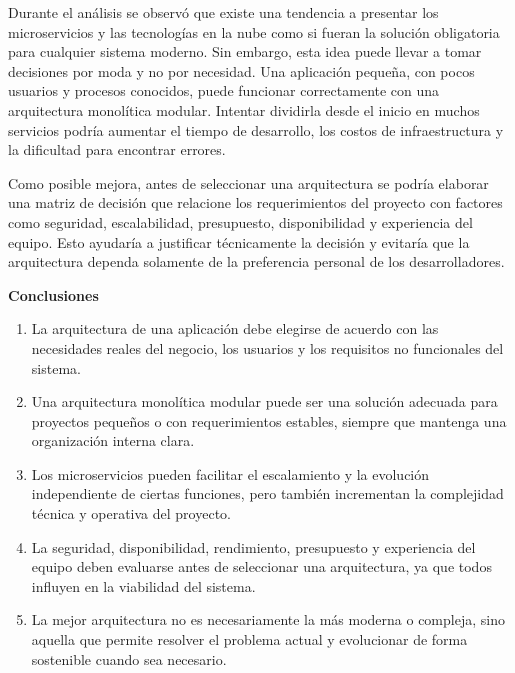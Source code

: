 \documentclass[12pt,letterpaper]{article}
\begin{document}
Durante el análisis se observó que existe una tendencia a presentar los microservicios y las tecnologías en la nube como si fueran la solución obligatoria para cualquier sistema moderno. Sin embargo, esta idea puede llevar a tomar decisiones por moda y no por necesidad. Una aplicación pequeña, con pocos usuarios y procesos conocidos, puede funcionar correctamente con una arquitectura monolítica modular. Intentar dividirla desde el inicio en muchos servicios podría aumentar el tiempo de desarrollo, los costos de infraestructura y la dificultad para encontrar errores.

Como posible mejora, antes de seleccionar una arquitectura se podría elaborar una matriz de decisión que relacione los requerimientos del proyecto con factores como seguridad, escalabilidad, presupuesto, disponibilidad y experiencia del equipo. Esto ayudaría a justificar técnicamente la decisión y evitaría que la arquitectura dependa solamente de la preferencia personal de los desarrolladores.

\textbf{Conclusiones}

\begin{enumerate}[label=\arabic*., leftmargin=*]
    \item La arquitectura de una aplicación debe elegirse de acuerdo con las necesidades reales del negocio, los usuarios y los requisitos no funcionales del sistema.
    
    \item Una arquitectura monolítica modular puede ser una solución adecuada para proyectos pequeños o con requerimientos estables, siempre que mantenga una organización interna clara.
    
    \item Los microservicios pueden facilitar el escalamiento y la evolución independiente de ciertas funciones, pero también incrementan la complejidad técnica y operativa del proyecto.
    
    \item La seguridad, disponibilidad, rendimiento, presupuesto y experiencia del equipo deben evaluarse antes de seleccionar una arquitectura, ya que todos influyen en la viabilidad del sistema.
    
    \item La mejor arquitectura no es necesariamente la más moderna o compleja, sino aquella que permite resolver el problema actual y evolucionar de forma sostenible cuando sea necesario.
\end{enumerate}
\end{document}
